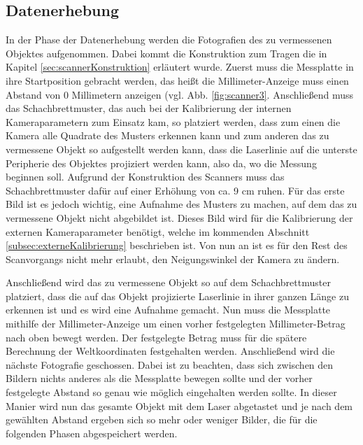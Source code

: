 \subsection{Datenerhebung}
\label{subsec:Datenerhebung}
In der Phase der Datenerhebung werden die Fotografien des zu vermessenen Objektes aufgenommen. Dabei kommt die Konstruktion zum Tragen die in Kapitel \ref{sec:scannerKonstruktion} erläutert wurde. Zuerst muss die Messplatte in ihre Startposition gebracht werden, das heißt die Millimeter-Anzeige muss einen Abstand von 0 Millimetern anzeigen (vgl. Abb. \ref{fig:scanner3}. Anschließend muss das Schachbrettmuster, das auch bei der Kalibrierung der internen Kameraparametern zum Einsatz kam, so platziert werden, dass zum einen die Kamera alle Quadrate des Musters erkennen kann und zum anderen das zu vermessene Objekt so aufgestellt werden kann, dass die Laserlinie auf die unterste Peripherie des Objektes projiziert werden kann, also da, wo die Messung beginnen soll. Aufgrund der Konstruktion des Scanners muss das Schachbrettmuster dafür auf einer Erhöhung von ca. 9 cm ruhen. Für das erste Bild ist es jedoch wichtig, eine Aufnahme des Musters zu machen, auf dem das zu vermessene Objekt nicht abgebildet ist. Dieses Bild wird für die Kalibrierung der externen Kameraparameter benötigt, welche im kommenden Abschnitt \ref{subsec:externeKalibrierung} beschrieben ist. Von nun an ist es für den Rest des Scanvorgangs nicht mehr erlaubt, den Neigungswinkel der Kamera zu ändern.\bigbreak

Anschließend wird das zu vermessene Objekt so auf dem Schachbrettmuster platziert, dass die auf das Objekt projizierte Laserlinie in ihrer ganzen Länge zu erkennen ist und es wird eine Aufnahme gemacht. Nun muss die Messplatte mithilfe der Millimeter-Anzeige um einen vorher festgelegten Millimeter-Betrag nach oben bewegt werden. Der festgelegte Betrag muss für die spätere Berechnung der Weltkoordinaten festgehalten werden. Anschließend wird die nächste Fotografie geschossen. Dabei ist zu beachten, dass sich zwischen den Bildern nichts anderes als die Messplatte bewegen sollte und der vorher festgelegte Abstand so genau wie möglich eingehalten werden sollte. In dieser Manier wird nun das gesamte Objekt mit dem Laser abgetastet und je nach dem gewählten Abstand ergeben sich so mehr oder weniger Bilder, die für die folgenden Phasen abgespeichert werden.      

